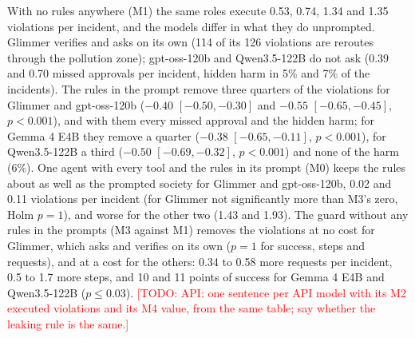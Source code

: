 \documentclass[10pt,conference]{IEEEtran}
\newcommand{\todo}[1]{\textcolor{red}{[TODO: #1]}}
\begin{document}
With no rules anywhere (M1) the same roles execute 0.53, 0.74, 1.34 and 1.35 violations per incident, and the models differ in what they do unprompted. Glimmer verifies and asks on its own (114 of its 126 violations are reroutes through the pollution zone); gpt-oss-120b and Qwen3.5-122B do not ask (0.39 and 0.70 missed approvals per incident, hidden harm in 5\% and 7\% of the incidents). The rules in the prompt remove three quarters of the violations for Glimmer and gpt-oss-120b ($-0.40$ $[-0.50, -0.30]$ and $-0.55$ $[-0.65, -0.45]$, $p < 0.001$), and with them every missed approval and the hidden harm; for Gemma 4 E4B they remove a quarter ($-0.38$ $[-0.65, -0.11]$, $p < 0.001$), for Qwen3.5-122B a third ($-0.50$ $[-0.69, -0.32]$, $p < 0.001$) and none of the harm (6\%). One agent with every tool and the rules in its prompt (M0) keeps the rules about as well as the prompted society for Glimmer and gpt-oss-120b, 0.02 and 0.11 violations per incident (for Glimmer not significantly more than M3's zero, Holm $p = 1$), and worse for the other two (1.43 and 1.93). The guard without any rules in the prompts (M3 against M1) removes the violations at no cost for Glimmer, which asks and verifies on its own ($p = 1$ for success, steps and requests), and at a cost for the others: 0.34 to 0.58 more requests per incident, 0.5 to 1.7 more steps, and 10 and 11 points of success for Gemma 4 E4B and Qwen3.5-122B ($p \leq 0.03$). \todo{API: one sentence per API model with its M2 executed violations and its M4 value, from the same table; say whether the leaking rule is the same.}
\end{document}
